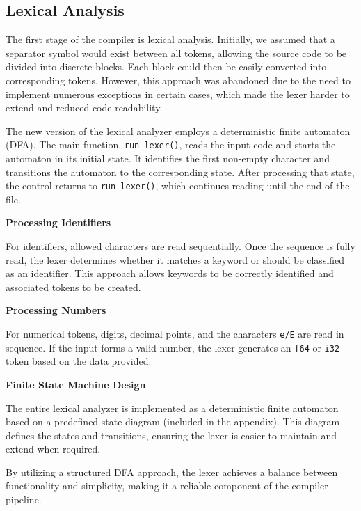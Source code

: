 \documentclass[a4paper, 11pt]{article}
\begin{document}
	\subsection{Lexical Analysis}

        The first stage of the compiler is lexical analysis. Initially, we assumed that a separator symbol would exist between all tokens, allowing the source code to be divided into discrete blocks. Each block could then be easily converted into corresponding tokens. However, this approach was abandoned due to the need to implement numerous exceptions in certain cases, which made the lexer harder to extend and reduced code readability.
        
        The new version of the lexical analyzer employs a deterministic finite automaton (DFA). The main function, \texttt{run\_lexer()}, reads the input code and starts the automaton in its initial state. It identifies the first non-empty character and transitions the automaton to the corresponding state. After processing that state, the control returns to \texttt{run\_lexer()}, which continues reading until the end of the file.
    
        \textbf{Processing Identifiers}
    
        For identifiers, allowed characters are read sequentially. Once the sequence is fully read, the lexer determines whether it matches a keyword or should be classified as an identifier. This approach allows keywords to be correctly identified and associated tokens to be created.
    
        \textbf{Processing Numbers}
    
        For numerical tokens, digits, decimal points, and the characters \texttt{e/E} are read in sequence. If the input forms a valid number, the lexer generates an \texttt{f64} or \texttt{i32} token based on the data provided.
        
        \textbf{Finite State Machine Design}
        
        The entire lexical analyzer is implemented as a deterministic finite automaton based on a predefined state diagram (included in the appendix). This diagram defines the states and transitions, ensuring the lexer is easier to maintain and extend when required.
        
        By utilizing a structured DFA approach, the lexer achieves a balance between functionality and simplicity, making it a reliable component of the compiler pipeline.
\end{document}
